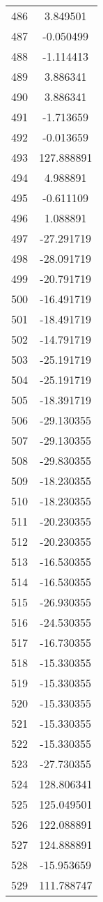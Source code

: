 \documentclass[12pt]{article}
\begin{document}
\begin{longtable}{@{}cc@{}}
486 & 3.849501 \\
487 & -0.050499 \\
488 & -1.114413 \\
489 & 3.886341 \\
490 & 3.886341 \\
491 & -1.713659 \\
492 & -0.013659 \\
493 & 127.888891 \\
494 & 4.988891 \\
495 & -0.611109 \\
496 & 1.088891 \\
497 & -27.291719 \\
498 & -28.091719 \\
499 & -20.791719 \\
500 & -16.491719 \\
501 & -18.491719 \\
502 & -14.791719 \\
503 & -25.191719 \\
504 & -25.191719 \\
505 & -18.391719 \\
506 & -29.130355 \\
507 & -29.130355 \\
508 & -29.830355 \\
509 & -18.230355 \\
510 & -18.230355 \\
511 & -20.230355 \\
512 & -20.230355 \\
513 & -16.530355 \\
514 & -16.530355 \\
515 & -26.930355 \\
516 & -24.530355 \\
517 & -16.730355 \\
518 & -15.330355 \\
519 & -15.330355 \\
520 & -15.330355 \\
521 & -15.330355 \\
522 & -15.330355 \\
523 & -27.730355 \\
524 & 128.806341 \\
525 & 125.049501 \\
526 & 122.088891 \\
527 & 124.888891 \\
528 & -15.953659 \\
529 & 111.788747 \\

\end{longtable}
\end{document}
